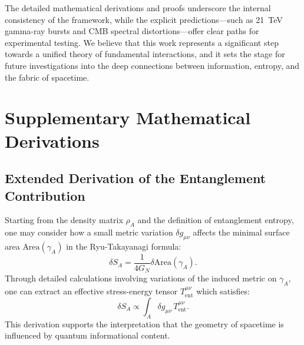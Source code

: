 \documentclass[12pt, a4paper]{article}
\begin{document}
The detailed mathematical derivations and proofs underscore the internal consistency of the framework, while the explicit predictions—such as 21~TeV gamma-ray bursts and CMB spectral distortions—offer clear paths for experimental testing. We believe that this work represents a significant step towards a unified theory of fundamental interactions, and it sets the stage for future investigations into the deep connections between information, entropy, and the fabric of spacetime.

\appendix

\section{Supplementary Mathematical Derivations}
\subsection{Extended Derivation of the Entanglement Contribution}
Starting from the density matrix \(\rho_A\) and the definition of entanglement entropy, one may consider how a small metric variation \(\delta g_{\mu\nu}\) affects the minimal surface area \(\text{Area}(\gamma_A)\) in the Ryu-Takayanagi formula:
\begin{equation}
    \delta S_A = \frac{1}{4G_N} \delta \text{Area}(\gamma_A).
\end{equation}
Through detailed calculations involving variations of the induced metric on \(\gamma_A\), one can extract an effective stress-energy tensor \(T^{\mu\nu}_{\text{ent}}\) which satisfies:
\begin{equation}
    \delta S_A \propto \int_A \delta g_{\mu\nu}\, T^{\mu\nu}_{\text{ent}}.
\end{equation}
This derivation supports the interpretation that the geometry of spacetime is influenced by quantum informational content.
\end{document}
